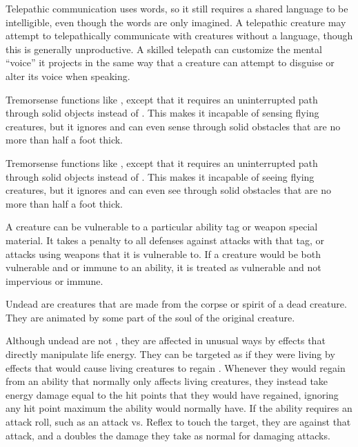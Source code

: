   Telepathic communication uses words, so it still requires a shared language to be intelligible, even though the words are only imagined.
  A telepathic creature may attempt to telepathically communicate with creatures without a language, though this is generally unproductive.
  A skilled telepath can customize the mental ``voice'' it projects in the same way that a creature can attempt to disguise or alter its voice when speaking.

  Tremorsense functions like , except that it requires an uninterrupted path through solid objects instead of .
  This makes it incapable of sensing flying creatures, but it ignores  and can even sense through solid obstacles that are no more than half a foot thick.

  Tremorsense functions like , except that it requires an uninterrupted path through solid objects instead of .
  This makes it incapable of seeing flying creatures, but it ignores  and can even see through solid obstacles that are no more than half a foot thick.

  A creature can be vulnerable to a particular ability tag or weapon special material.
  It takes a  penalty to all defenses against attacks with that tag, or attacks using weapons that it is vulnerable to.
  If a creature would be both vulnerable and \impervious or immune to an ability, it is treated as vulnerable and not impervious or immune.

  Undead are creatures that are made from the corpse or spirit of a dead creature.
  They are animated by some part of the soul of the original creature.

  Although undead are not , they are affected in unusual ways by effects that directly manipulate life energy.
  They can be targeted as if they were living  by \magical effects that would cause living creatures to regain .
  Whenever they would regain  from an ability that normally only affects living creatures, they instead take energy damage equal to the hit points that they would have regained, ignoring any hit point maximum the ability would normally have.
  If the ability requires an attack roll, such as an attack vs. Reflex to touch the target, they are \vulnerable against that attack, and a  doubles the damage they take as normal for damaging attacks.

